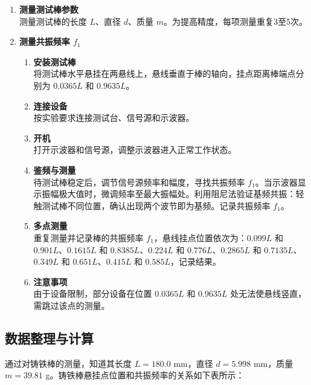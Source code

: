 \documentclass[zihao=5, UTF8]{article}
\theoremstyle{MyLineTheoremStyle} %
\theoremstyle{MyBlockTheoremStyle} %
\theoremstyle{MySubsubsectionStyle} %
\begin{document}
\begin{enumerate}
    \item \textbf{测量测试棒参数} \\
    测量测试棒的长度 \(L\)、直径 \(d\)、质量 \(m\)。为提高精度，每项测量重复3至5次。
    
    \item \textbf{测量共振频率 \(f_1\)}
    \begin{enumerate}
        \item \textbf{安装测试棒} \\
        将测试棒水平悬挂在两悬线上，悬线垂直于棒的轴向，挂点距离棒端点分别为 \(0.0365L\) 和 \(0.9635L\)。
        
        \item \textbf{连接设备} \\
        按实验要求连接测试台、信号源和示波器。
        
        \item \textbf{开机} \\
        打开示波器和信号源，调整示波器进入正常工作状态。
        
        \item \textbf{鉴频与测量} \\
        待测试棒稳定后，调节信号源频率和幅度，寻找共振频率 \(f_1\)。当示波器显示振幅极大值时，微调频率至最大振幅处。利用阻尼法验证基频共振：轻触测试棒不同位置，确认出现两个波节即为基频。记录共振频率 \(f_1\)。
        
        \item \textbf{多点测量} \\
        重复测量并记录棒的共振频率 \(f_1\)，悬线挂点位置依次为：\(0.099L\) 和 \(0.901L\)、\(0.1615L\) 和 \(0.8385L\)、\(0.224L\) 和 \(0.776L\)、\(0.2865L\) 和 \(0.7135L\)、\(0.349L\) 和 \(0.651L\)、\(0.415L\) 和 \(0.585L\)，记录结果。
        
        \item \textbf{注意事项} \\
        由于设备限制，部分设备在位置 \(0.0365L\) 和 \(0.9635L\) 处无法使悬线竖直，需跳过该点的测量。
    \end{enumerate}
\end{enumerate}

\subsection{数据整理与计算}

通过对铸铁棒的测量，知道其长度 \(L = 180.0\) mm，直径 \(d = 5.998\) mm，质量 \(m = 39.81\) g。铸铁棒悬挂点位置和共振频率的关系如下表所示：
\end{document}

